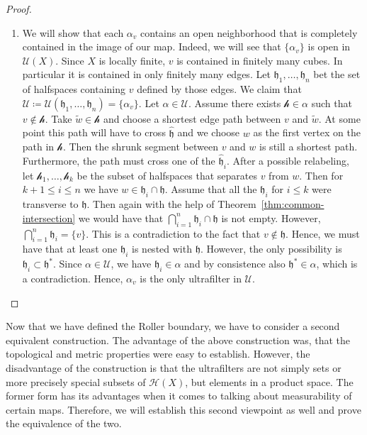\begin{proof}
\begin{enumerate}
  \item We will show that each \(\alpha_v\) contains an open neighborhood that is completely contained in the image of our map. Indeed, we will see that \(\{\alpha_v\}\) is open in \(\mathcal{U}(X)\). Since \(X\) is locally finite, \(v\) is contained in finitely many cubes. In particular it is contained in only finitely many edges. Let \(\mathfrak{h}_1, \dots, \mathfrak{h}_n\) bet the set of halfspaces containing \(v\) defined by those edges. We claim that \(\mathcal{U} \coloneqq \mathcal{U}(\mathfrak{h}_1, \dots, \mathfrak{h}_n) = \{\alpha_v\}\). Let \(\alpha \in \mathcal{U}\). Assume there exists \(\mathcal{h} \in \alpha\) such that \(v \not \in \mathcal{h}\). Take \(\tilde w \in \mathcal{h}\) and choose a shortest edge path between \(v\) and \(\tilde w\). At some point this path will have to cross \(\mathfrak{\hat h}\) and we choose \(w\) as the first vertex on the path in \(\mathcal{h}\). Then the shrunk segment between \(v\) and \(w\) is still a shortest path. Furthermore, the path must cross one of the \(\mathfrak{\hat h}_i\). After a possible relabeling, let \(\mathcal{h}_1, \dots, \mathcal{h}_k\) be the subset of halfspaces that separates \(v\) from \(w\). Then for \(k+1 \leq i \leq n\) we have \(w \in \mathfrak{h}_i \cap \mathfrak{h}\). Assume that all the \(\mathfrak{h}_i\) for \(i \leq k\) were transverse to \(\mathfrak{h}\). Then again with the help of Theorem~\ref{thm:common-intersection} we would have that \(\bigcap_{i=1}^n \mathfrak{h}_i \cap \mathfrak{h}\) is not empty. However, \(\bigcap_{i=1}^n \mathfrak{h}_i = \{v\}\). This is a contradiction to the fact that \(v \not\in \mathfrak{h}\). Hence, we must have that at least one \(\mathfrak{h}_i\) is nested with \(\mathfrak{h}\). However, the only possibility is \(\mathfrak{h}_i \subset \mathfrak{h}^\ast\). Since \(\alpha \in \mathcal{U}\), we have \(\mathfrak{h}_i \in \alpha\) and by consistence also \(\mathfrak{h}^\ast \in \alpha\), which is a contradiction. Hence, \(\alpha_v\) is the only ultrafilter in \(\mathcal{U}\).
  \end{enumerate}
\end{proof}

Now that we have defined the Roller boundary, we have to consider a second equivalent construction. The advantage of the above construction was, that the topological and metric properties were easy to establish. However, the disadvantage of the construction is that the ultrafilters are not simply sets or more precisely special subsets of \(\mathcal{H}(X)\), but elements in a product space. The former form has its advantages when it comes to talking about measurability of certain maps. Therefore, we will establish this second viewpoint as well and prove the equivalence of the two.

